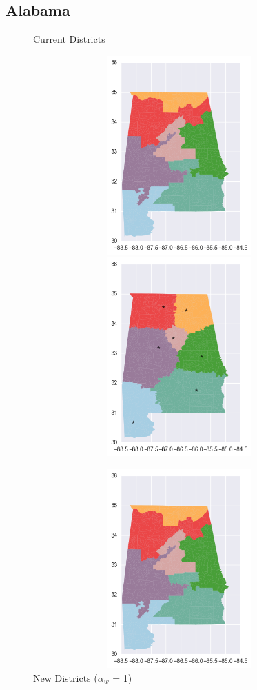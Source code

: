 \subsection{Alabama}
\begin{figure}[htb!] \centering
\caption{ Current Districts }
\includegraphics[width=5in,height=3in,keepaspectratio]{../maps/AL/static/before.png}
\includegraphics[width=5in,height=3in,keepaspectratio]{../maps/AL/static/0_0_after.png}
\caption{ New Districts ($\alpha_w$ = 1) }
\includegraphics[width=5in,height=3in,keepaspectratio]{../maps/AL/static/before.png}

\end{figure}

